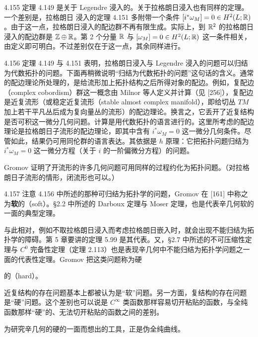 \begin{remark}{4.155}
  定理 4.149 是关于 Legendre 浸入的。关于拉格朗日浸入也有同样的定理。一个差别是，拉格朗日
  浸入的定理 4.151 多附带一个条件 $[i^*\omega_M]=0\in H^2(L;\mathbb{R})$。由于这一点，拉格朗日浸入的配边群不再有限生成。实际上，到 $\mathbb{R}^2$ 的拉格朗日浸入的配边群是 $\mathbb{Z}\oplus\mathbb{R}$。第 2 个分量 $\mathbb{R}$ 与 $[\omega_M]=0\in H^2(L;\mathbb{R})$ 这一条件相关，由定义即可明白。不过差别仅在于这一点，其余同样进行。
\end{remark}

\begin{remark}{4.156}
  定理 4.149 与 4.151 表明，拉格朗日浸入与 Legendre 浸入的问题可以归结为代数拓扑的问题。下面再稍微说明“归结为代数拓扑的问题”这句话的含义。通常的配边理论所处理的，是给流形加上拓扑结构之后所得对象的配边。例如，复配边（complex cobordism）群这一概念由 Milnor 等人定义并计算（见 [256]），复配边是近复流形（或稳定近复流形（stable almost complex manifold），即给切丛 $TM$ 加上若干平凡丛后成为复向量丛的流形）的配边理论。换言之，它丢开了近复结构是否可积这一微分几何问题。计算是用代数拓扑的语言进行的。这里所考虑的配边理论是拉格朗日子流形的配边理论，即其中含有 $i^*\omega_M=0$ 这一微分几何条件。尽管如此，结果仍可用同伦群的语言表达。其依据是 $h$ 原理：它把拓扑问题归结为 $i^*\omega_M=0$ 这一微分方程（关于 $i$ 的一阶偏微分方程）的问题。

  Gromov 证明了开流形的许多几何问题可用同样的过程约化为拓扑问题。（对拉格朗日子流形的情形，闭流形也可以。）
\end{remark}

\begin{remark}{4.157}
  注意 4.156 中所述的那种可归结为拓扑学的问题，Gromov 在 [161] 中称之为\textbf{软}的（soft）。§2.2 中所述的 Darboux 定理与 Moser 定理，也是代表辛几何软的一面的典型定理。

  与此相对，例如不取拉格朗日浸入而考虑拉格朗日嵌入时，就会出现不能归结为拓扑学的障碍。第 5 章要讲的定理 5.99 是其代表。又，§2.7 中所述的不可压缩性定理与 $C^0$ 完备性定理（定理 2.113）也是表现辛几何中不能归结为拓扑学问题之一面的代表性定理。Gromov 把这类问题称为硬

  的（hard）。
\end{remark}

近复结构的存在问题基本上都被认为是“软”问题。另一方面，复结构的存在问题是“硬”问题。这个差别也可以说是 $C^\infty$ 类函数那样容易切开粘贴的函数，与全纯函数那样“硬”的、无法切开粘贴的函数之间的差别。

为研究辛几何的硬的一面而想出的工具，正是伪全纯曲线。

